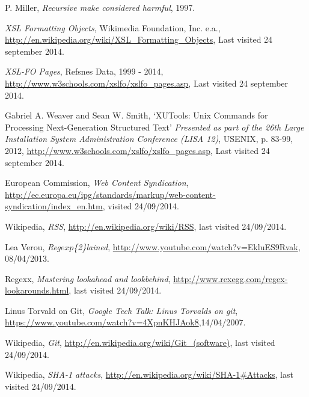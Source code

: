 \renewcommand{\bibname}{References}

\begin{thebibliography}{90}


  P. Miller,
  \emph{Recursive make considered harmful},
  1997.

  \emph{XSL Formatting Objects},
  Wikimedia Foundation, Inc. e.a., 
  \url{http://en.wikipedia.org/wiki/XSL\_Formatting\_Objects},
  Last visited 24 september 2014.

  \emph{XSL-FO Pages},
  Refsnes Data,
  1999 - 2014,
  \url{http://www.w3schools.com/xslfo/xslfo\_pages.asp},
  Last visited 24 september 2014.

  Gabriel A. Weaver and Sean W. Smith,
  `XUTools: Unix Commands for Processing Next-Generation Structured Text'
  \emph{Presented as part of the 26th Large Installation System Administration Conference (LISA 12)},
  USENIX,
  p. 83-99,
  2012,
  \url{http://www.w3schools.com/xslfo/xslfo\_pages.asp},
  Last visited 24 september 2014.
  
    European Commission, 
    \emph{Web Content Syndication},
    \url{http://ec.europa.eu/ipg/standards/markup/web-content-syndication/index\_en.htm}, visited 24/09/2014.
    
    Wikipedia,
    \emph{RSS},
    \url{http://en.wikipedia.org/wiki/RSS}, last visited 24/09/2014.

	Lea Verou,
	\emph{Reg\(exp\)\{2\}lained},
	\url{http://www.youtube.com/watch?v=EkluES9Rvak}, 08/04/2013.

    Regexx,
    \emph{Mastering lookahead and lookbehind},
	\url{http://www.rexegg.com/regex-lookarounds.html}, last visited 24/09/2014.

    Linus Torvald on Git,
    \emph{Google Tech Talk: Linus Torvalds on git},
	\url{https://www.youtube.com/watch?v=4XpnKHJAok8},14/04/2007.
	
    Wikipedia,
    \emph{Git},
    \url{http://en.wikipedia.org/wiki/Git\_(software)}, last visited 24/09/2014.
    
    Wikipedia,
    \emph{SHA-1 attacks},
    \url{http://en.wikipedia.org/wiki/SHA-1#Attacks}, last visited 24/09/2014.

\end{thebibliography}
